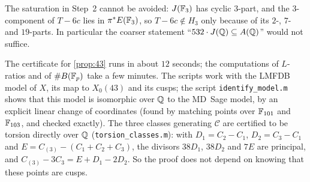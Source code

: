 \begin{remark}
The saturation in Step~2 cannot be avoided: $J(\mathbb{F}_3)$ has cyclic $3$-part, and the $3$-component of $T-6c$
lies in $\pi^*E(\mathbb{F}_3)$, so $T-6c\notin H_3$ only because of its $2$-, $7$- and $19$-parts. In particular the
coarser statement ``$532\cdot J(\mathbb{Q})\subseteq A(\mathbb{Q})$'' would not suffice.
\end{remark}

The certificate for \cref{prop:43} runs in about $12$ seconds; the computations of $L$-ratios and of
$\#B(\mathbb{F}_p)$ take a few minutes.
The scripts work with the LMFDB model of $X$, its map to $X_0(43)$ and its cusps; the script
\texttt{identify\_model.m} shows that this model is isomorphic over $\mathbb{Q}$ to the MD~Sage model, by an explicit
linear change of coordinates (found by matching points over $\mathbb{F}_{101}$ and $\mathbb{F}_{103}$, and checked exactly). The three
classes generating $\mathcal C$ are certified to be torsion directly over $\mathbb{Q}$ (\texttt{torsion\_classes.m}): with
$D_1=C_2-C_1$, $D_2=C_3-C_1$ and $E=C_{(3)}-(C_1+C_2+C_3)$, the divisors $38D_1$, $38D_2$ and $7E$ are principal,
and $C_{(3)}-3C_3=E+D_1-2D_2$. So the proof does not depend on knowing that these points are cusps.
